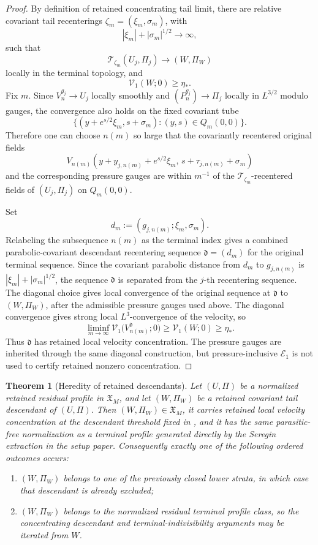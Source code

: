 \documentclass[11pt]{amsart}
\numberwithin{equation}{section}
\theoremstyle{plain}
\newtheorem{theorem}{Theorem}[section]
\theoremstyle{definition}
\theoremstyle{remark}
\newcommand{\calE}{\mathcal E}
\newcommand{\Vel}{\mathcal V}
\begin{document}
\begin{proof}
By definition of retained concentrating tail limit, there are relative
covariant tail recenterings \(\zeta_m=(\xi_m,\sigma_m)\), with
\[
   |\xi_m|+|\sigma_m|^{1/2}\to\infty,
\]
such that
\[
   \mathscr T_{\zeta_m}(U_j,\Pi_j)\to(W,\Pi_W)
\]
locally in the terminal topology, and
\[
   \Vel_1(W;0)\ge\eta_* .
\]
Fix \(m\).  Since \(V_n^{g_j}\to U_j\) locally smoothly and
\((P_n^{g_j})\to\Pi_j\) locally in \(L^{3/2}\) modulo gauges, the convergence
also holds on the fixed covariant tube
\[
   \{(y+e^{s/2}\xi_m,s+\sigma_m):(y,s)\in Q_m(0,0)\}.
\]
Therefore one can choose \(n(m)\) so large that the covariantly recentered
original fields
\[
   V_{n(m)}(y+y_{j,n(m)}+e^{s/2}\xi_m,\,
             s+\tau_{j,n(m)}+\sigma_m)
\]
and the corresponding pressure gauges are within \(m^{-1}\) of the
\(\mathscr T_{\zeta_m}\)-recentered fields of \((U_j,\Pi_j)\) on
\(Q_m(0,0)\).

Set
\[
   d_m:=(g_{j,n(m)};\xi_m,\sigma_m).
\]
Relabeling the subsequence \(n(m)\) as the terminal index gives a combined
parabolic-covariant descendant recentering sequence \(\mathfrak d=(d_m)\) for the
original terminal sequence.  Since the covariant parabolic distance from \(d_m\) to
\(g_{j,n(m)}\) is
\(|\xi_m|+|\sigma_m|^{1/2}\), the sequence \(\mathfrak d\) is separated from the
\(j\)-th recentering sequence.  The diagonal choice gives local convergence of
the original sequence at \(\mathfrak d\) to \((W,\Pi_W)\), after the admissible
pressure gauges used above.  The diagonal convergence gives strong local
\(L^3\)-convergence of the velocity, so
\[
   \liminf_{m\to\infty}
      \Vel_1\bigl(V_{n(m)}^{\mathfrak d};0\bigr)
   \ge
   \Vel_1(W;0)
   \ge\eta_* .
\]
Thus \(\mathfrak d\) has retained local velocity concentration.  The pressure
gauges are inherited through the same diagonal construction, but
pressure-inclusive \(\calE_1\) is not used to certify retained nonzero
concentration.
\end{proof}

\begin{theorem}[Heredity of retained descendants]
\label{thm:descendant-heredity}
Let \((U,\Pi)\) be a normalized retained residual profile in
\(\mathfrak X_M\), and let \((W,\Pi_W)\) be a retained covariant tail
descendant of \((U,\Pi)\).  Then \((W,\Pi_W)\in\mathfrak X_M\), it carries
retained local velocity concentration at the descendant threshold fixed in
, and it has the same parasitic-free normalization
as a terminal profile generated directly by the Seregin extraction in the
setup paper.
Consequently exactly one of the following ordered outcomes occurs:
\begin{enumerate}[label=\textup{(\roman*)}]
   \item \((W,\Pi_W)\) belongs to one of the previously closed lower strata,
   in which case that descendant is already excluded;
   \item \((W,\Pi_W)\) belongs to the normalized residual terminal profile class,
   so the concentrating descendant and terminal-indivisibility arguments may be iterated
   from \(W\).
\end{enumerate}
\end{theorem}
\end{document}
